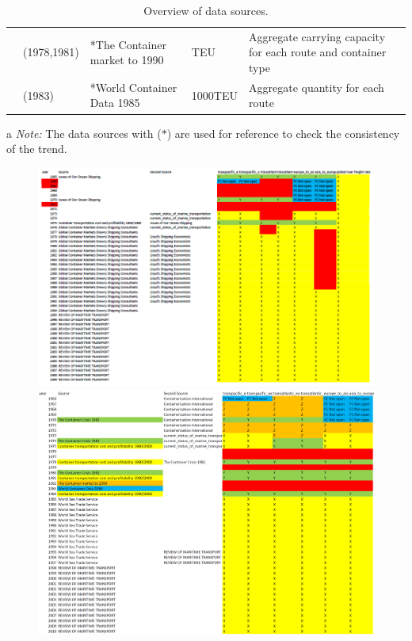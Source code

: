 \begin{landscape}
{\begin{table}[htb]
{\begin{tabular}{lllll}
                    &(1978,1981)&*The Container market to 1990 &TEU&Aggregate carrying capacity for each route and container type\\
                    &(1983)&*World Container Data 1985 &1000TEU&Aggregate quantity for each route
  \end{tabular}
  \begin{tablenotes}
\item[a]\textit{Note:} The data sources with ($*$) are used for reference to check the consistency of the trend.
\end{tablenotes}
  }
  \caption{Overview of data sources.}
  \label{tb:overview_of_datasources}
\end{table}
\begin{figure}[!ht]
\begin{minipage}[b]{0.45\linewidth}
  \centering
  \includegraphics[height = 0.4\textheight]{figuretable/freight_rate_filled_and_imputed_summary.png}
  \end{minipage}
  \begin{minipage}[b]{0.45\linewidth}
  \centering
  \includegraphics[height = 0.4\textheight]{figuretable/traffic_amount_filled_and_imputed_summary.png}

\end{minipage}
\end{figure}}
\end{landscape}
